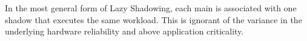 In the most general form of Lazy Shadowing, each main is associated with one shadow that executes the same workload. This is ignorant of the variance in the underlying hardware reliability and above application criticality.